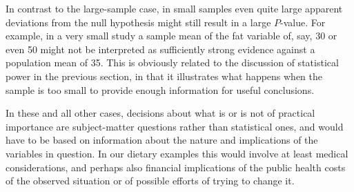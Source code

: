 In contrast to the large-sample case, in small samples even quite large
apparent deviations from the null hypothesis might still result in a
large $P$-value. For example, in a very small study a sample mean of the
fat variable of, say, 30 or even 50 might not be interpreted as sufficiently
strong evidence against a population mean of 35. This is obviously
related to the discussion of statistical power in the previous section,
in that it illustrates what happens when the sample is too small to
provide enough information for useful conclusions.

In these and all other cases, decisions about what is or is not of
practical importance are subject-matter questions rather than statistical ones,
and would have to be based on information about the nature and
implications of the variables in question. In our dietary examples this
would involve at least medical considerations, and perhaps also
financial implications of the public health costs of the observed
situation or of possible efforts of trying to change it.
